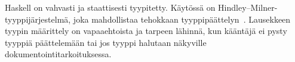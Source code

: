 \documentclass[finnish]{tktltiki2}
\theoremstyle{definition}
\theoremstyle{remark}
\begin{document}
Haskell on vahvasti ja staattisesti tyypitetty. Käytössä on Hindley--Milner-tyyppijärjestelmä, joka mahdollistaa tehokkaan tyyppipäättelyn~\cite[luku~4.1]{Mar10}. Lausekkeen tyypin määrittely on vapaaehtoista ja tarpeen lähinnä, kun kääntäjä ei pysty tyyppiä päättelemään tai jos tyyppi halutaan näkyville dokumentointitarkoituksessa.


%
%
% 
%







% 
\end{document}
